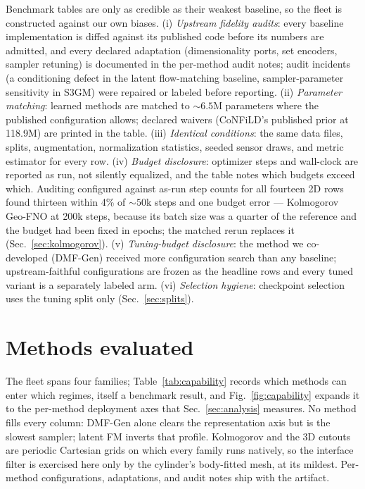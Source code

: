 \documentclass[aip,pof,reprint,amsmath,amssymb,superscriptaddress]{revtex4-1}
\newcommand{\dmfgen}{DMF-Gen}
\begin{document}
Benchmark tables are only as credible as their weakest baseline, so the fleet
is constructed against our own biases. (i) \emph{Upstream
fidelity audits}: every baseline implementation is diffed against its
published code before its numbers are admitted, and every declared adaptation
(dimensionality ports, set encoders, sampler retuning) is documented in the
per-method audit notes; audit incidents (a conditioning defect in the latent
flow-matching baseline, sampler-parameter sensitivity in S3GM) were repaired
or labeled before reporting. (ii) \emph{Parameter matching}: learned methods
are matched to ${\sim}6.5$M parameters where the published configuration
allows; declared waivers (CoNFiLD's published prior at 118.9M) are printed in
the table. (iii) \emph{Identical conditions}: the same data files, splits,
augmentation, normalization statistics, seeded sensor draws, and metric
estimator for every row. (iv) \emph{Budget disclosure}: optimizer steps and
wall-clock are reported as run, not silently equalized, and the table notes
which budgets exceed which. Auditing configured against as-run step counts for
all fourteen 2D rows found thirteen within 4\% of ${\sim}50$k steps and one
budget error --- Kolmogorov Geo-FNO at 200k steps, because its batch size was
a quarter of the reference and the budget had been fixed in epochs; the
matched rerun replaces it (Sec.~\ref{sec:kolmogorov}). (v)
\emph{Tuning-budget disclosure}: the
method we co-developed (\dmfgen{}) received more configuration search than any
baseline; upstream-faithful configurations are frozen as the headline rows and
every tuned variant is a separately labeled arm. (vi) \emph{Selection
hygiene}: checkpoint selection uses the tuning split only
(Sec.~\ref{sec:splits}).

\section{Methods evaluated}\label{sec:methods}

The fleet spans four families; Table~\ref{tab:capability} records which
methods can enter which regimes, itself a benchmark result, and
Fig.~\ref{fig:capability} expands it to the per-method deployment axes that
Sec.~\ref{sec:analysis} measures. No method fills every column: \dmfgen{}
alone clears the representation axis but is the slowest sampler; latent FM
inverts that profile. Kolmogorov and the 3D cutouts are periodic Cartesian
grids on which every family runs natively, so the interface filter is
exercised here only by the cylinder's body-fitted mesh, at its mildest.
Per-method configurations, adaptations, and audit notes ship with the
artifact.
\end{document}
